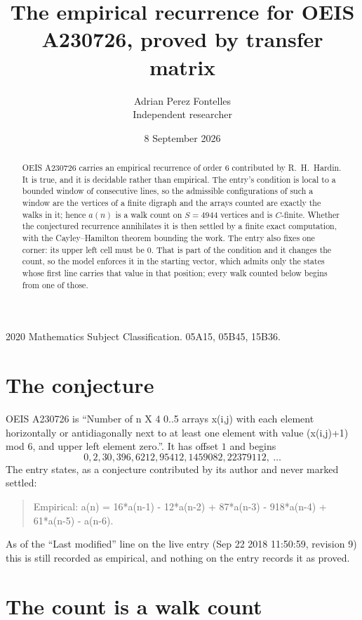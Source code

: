 \documentclass[11pt,a4paper]{article}
\title{The empirical recurrence for OEIS A230726, proved by transfer matrix}
\author{Adrian Perez Fontelles\\ \small Independent researcher}
\date{8 September 2026}
\theoremstyle{plain}
\theoremstyle{definition}
\begin{document}
\maketitle

\begin{abstract}
OEIS A230726 carries an empirical recurrence of order $6$ contributed by R.~H.~Hardin. It is
true, and it is decidable rather than empirical. The entry's condition is local to a bounded window of consecutive lines, so
the admissible configurations of such a window are the vertices of a finite digraph and the
arrays counted are exactly the walks in it; hence $a(n)$ is a walk count on $S=4944$ vertices
and is $C$-finite. Whether the conjectured recurrence annihilates it is then settled by a
finite exact computation, with the Cayley--Hamilton theorem bounding the work.
 The entry also fixes one corner: its upper left cell must be $0$. That is part of the condition and it changes the count, so the model enforces it in the starting vector, which admits only the states whose first line carries that value in that position; every walk counted below begins from one of those.\end{abstract}

\noindent\small 2020 Mathematics Subject Classification. 05A15, 05B45, 15B36.\normalsize

\section{The conjecture}

OEIS A230726 is ``Number of n X 4 0..5 arrays x(i,j) with each element horizontally or antidiagonally next to at least one element with value (x(i,j)+1) mod 6, and upper left element zero.''. It has offset $1$ and begins
\[
0, 2, 30, 396, 6212, 95412, 1459082, 22379112,\ \dots
\]
The entry states, as a conjecture contributed by its author and never marked settled:
\begin{quote}
Empirical: a(n) = 16*a(n-1) - 12*a(n-2) + 87*a(n-3) - 918*a(n-4) + 61*a(n-5) - a(n-6).
\end{quote}
As of the ``Last modified'' line on the live entry (Sep 22 2018 11:50:59, revision 9) this is still
recorded as empirical, and nothing on the entry records it as proved.

\section{The count is a walk count}
\end{document}
